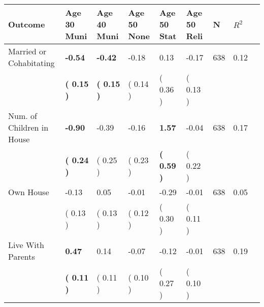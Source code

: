\begin{tabular}{L{6.2cm} C{1.8cm} C{1.8cm} C{1.8cm} C{1.8cm} C{1.8cm} C{1.8cm} C{0.3cm} C{0.3cm}}
\toprule
 \textbf{Outcome} & \textbf{Age 30 Muni} & \textbf{Age 40 Muni} & \textbf{Age 50 None} & \textbf{Age 50 Stat} & \textbf{Age 50 Reli} & \textbf{N} & \textbf{$ R^2$} \\
\midrule
Married or Cohabitating & \textbf{    -0.54} & \textbf{    -0.42} &     -0.18 &      0.13 &     -0.17  & 638 &       0.12 \\ 
 & \textbf{(     0.15 )} & \textbf{(     0.15 )} & (     0.14 ) & (     0.36 ) & (     0.13 )  & \\
Num. of Children in House & \textbf{    -0.90} &     -0.39 &     -0.16 & \textbf{     1.57} &     -0.04  & 638 &       0.17 \\ 
 & \textbf{(     0.24 )} & (     0.25 ) & (     0.23 ) & \textbf{(     0.59 )} & (     0.22 )  & \\
Own House &     -0.13 &      0.05 &     -0.01 &     -0.29 &     -0.01  & 638 &       0.05 \\ 
 & (     0.13 ) & (     0.13 ) & (     0.12 ) & (     0.30 ) & (     0.11 )  & \\
Live With Parents & \textbf{     0.47} &      0.14 &     -0.07 &     -0.12 &     -0.01  & 638 &       0.19 \\ 
 & \textbf{(     0.11 )} & (     0.11 ) & (     0.10 ) & (     0.27 ) & (     0.10 )  & \\
\bottomrule
\end{tabular}
